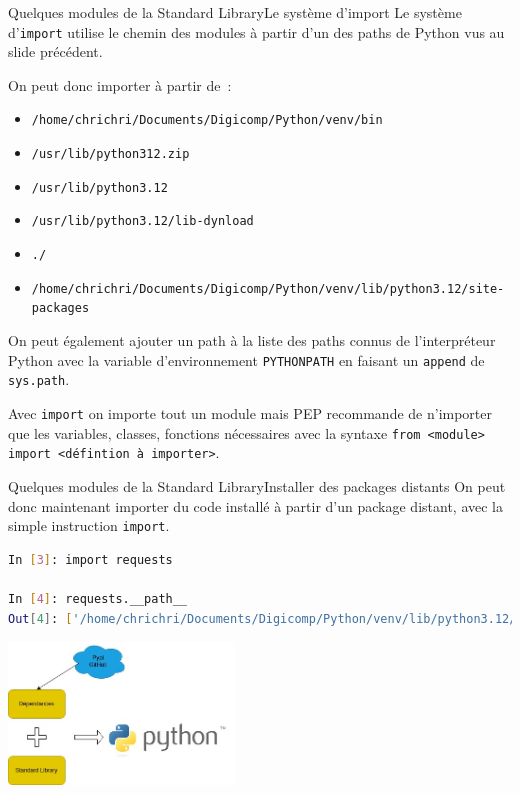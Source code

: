 \documentclass{beamer}
\begin{document}
    \begin{frame}{Quelques modules de la Standard Library}{Le système d'import}
        Le système d'\lstinline{import} utilise le chemin des modules à partir d'un des paths de Python vus au slide précédent.

        On peut donc importer à partir de~:
        \begin{itemize}
            \item \lstinline{/home/chrichri/Documents/Digicomp/Python/venv/bin}
            \item \lstinline{/usr/lib/python312.zip}
            \item \lstinline{/usr/lib/python3.12}
            \item \lstinline{/usr/lib/python3.12/lib-dynload}
            \item \lstinline{./}
            \item \lstinline{/home/chrichri/Documents/Digicomp/Python/venv/lib/python3.12/site-packages}
        \end{itemize}
        \bigbreak
        On peut également ajouter un path à la liste des paths connus de l'interpréteur Python avec la variable d'environnement \lstinline{PYTHONPATH} en faisant un \lstinline{append} de \lstinline{sys.path}.

        Avec \lstinline{import} on importe tout un module mais PEP recommande de n'importer que les variables, classes, fonctions nécessaires avec la syntaxe \lstinline{from <module> import <défintion à importer>}.
    \end{frame}

    \begin{frame}[fragile]{Quelques modules de la Standard Library}{Installer des packages distants}
        On peut donc maintenant importer du code installé à partir d'un package distant, avec la simple instruction \lstinline{import}.
        \begin{lstlisting}[language=Bash]
In [3]: import requests

In [4]: requests.__path__
Out[4]: ['/home/chrichri/Documents/Digicomp/Python/venv/lib/python3.12/site-packages/requests']
        \end{lstlisting}
        \bigbreak
        \begin{center}
            \includegraphics[width=6cm]{image/std-plus-dependencies}
        \end{center}
    \end{frame}
\end{document}
